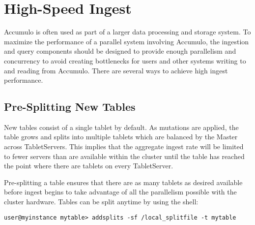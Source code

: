 
%
%

\chapter{High-Speed Ingest}

Accumulo is often used as part of a larger data processing and storage system. To
maximize the performance of a parallel system involving Accumulo, the ingestion
and query components should be designed to provide enough parallelism and
concurrency to avoid creating bottlenecks for users and other systems writing to
and reading from Accumulo. There are several ways to achieve high ingest
performance.

\section{Pre-Splitting New Tables}

New tables consist of a single tablet by default. As mutations are applied, the table
grows and splits into multiple tablets which are balanced by the Master across
TabletServers. This implies that the aggregate ingest rate will be limited to fewer
servers than are available within the cluster until the table has reached the point
where there are tablets on every TabletServer.

Pre-splitting a table ensures that there are as many tablets as desired available
before ingest begins to take advantage of all the parallelism possible with the cluster
hardware. Tables can be split anytime by using the shell:

\small
\begin{verbatim}
user@myinstance mytable> addsplits -sf /local_splitfile -t mytable
\end{verbatim}
\normalsize

